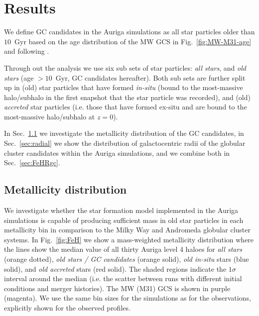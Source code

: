 \documentclass[a4paper,fleqn,usenatbib]{mnras}
\begin{document}
\section{Results}
\label{sec:results}
We define GC candidates in the Auriga simulations as all star particles older 
than $10$~Gyr based on the age distribution of the MW GCS in 
Fig.~\ref{fig:MW-M31-age} and following \citet{2017MNRAS.465.3622R}.

Through out the analysis we use six sub sets of star particles: 
\emph{all stars}, and \emph{old stars} (age $>10$~Gyr, GC candidates hereafter). 
Both sub sets are further split up in (old) star particles that have formed 
\emph{in-situ} (bound to the most-massive halo/subhalo in the first snapshot that 
the star particle was recorded), and (old) \emph{accreted} star particles (i.e. 
those that have formed ex-situ and are bound to the most-massive halo/subhalo
at $z=0$). 

In Sec.~\ref{sec:metallicity} we investigate the metallicity distribution of the
GC candidates, in Sec.~\ref{sec:radial} we show the distribution of galactocentric
radii of the globular cluster candidates within the Auriga simulations, and we 
combine both in Sec.~\ref{sec:FeHRgc}. 

\subsection{Metallicity distribution}
\label{sec:metallicity}
We investigate whether the star formation model implemented in the Auriga 
simulations is capable of producing sufficient mass in old star particles in 
each metallicity bin in comparison to the Milky Way and Andromeda globular 
cluster systems. In Fig.~\ref{fig:FeH} we show a mass-weighted metallicity 
distribution where the lines show the median value of all thirty Auriga level 4 
haloes for \emph{all stars} (orange dotted), \emph{old stars / GC candidates} 
(orange solid), \emph{old in-situ} stars (blue solid), and \emph{old accreted} stars
(red solid). The shaded regions indicate the $1\sigma$ interval around the median 
(i.e. the scatter between runs with different initial conditions and merger
histories). The MW (M31) GCS is shown in purple (magenta). We use the 
same bin sizes for the simulations as for the observations, explicitly shown for
the observed profiles.
\end{document}

